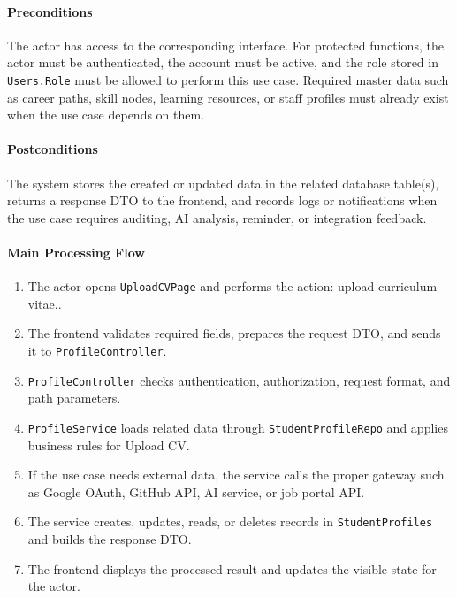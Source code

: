 \paragraph{Preconditions}

The actor has access to the corresponding interface. For protected functions, the actor must be authenticated, the account must be active, and the role stored in \texttt{Users.Role} must be allowed to perform this use case. Required master data such as career paths, skill nodes, learning resources, or staff profiles must already exist when the use case depends on them.

\paragraph{Postconditions}

The system stores the created or updated data in the related database table(s), returns a response DTO to the frontend, and records logs or notifications when the use case requires auditing, AI analysis, reminder, or integration feedback.

\paragraph{Main Processing Flow}

\begin{enumerate}
    \item The actor opens \texttt{UploadCVPage} and performs the action: upload curriculum vitae..
    \item The frontend validates required fields, prepares the request DTO, and sends it to \texttt{ProfileController}.
    \item \texttt{ProfileController} checks authentication, authorization, request format, and path parameters.
    \item \texttt{ProfileService} loads related data through \texttt{StudentProfileRepo} and applies business rules for Upload CV.
    \item If the use case needs external data, the service calls the proper gateway such as Google OAuth, GitHub API, AI service, or job portal API.
    \item The service creates, updates, reads, or deletes records in \texttt{StudentProfiles} and builds the response DTO.
    \item The frontend displays the processed result and updates the visible state for the actor.
\end{enumerate}

